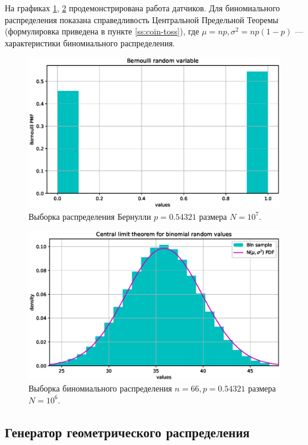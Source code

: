 \documentclass[11pt]{report}
\begin{document}
На графиках \ref{fig:bern}, \ref{fig:bin-clt} продемонстрирована работа датчиков. Для биномиального распределения показана справедливость Центральной Предельной Теоремы (формулировка приведена в пункте \ref{ss:coin-toss}), где $\mu = np, \sigma^2 = np(1-p)$ --- характеристики биномиального распределения.

\begin{figure}[H]
    \centering
    \includegraphics[width=0.9\linewidth]{bern.eps}
    \caption{Выборка распределения Бернулли $p=0.54321$ размера $N=10^7$.}
    \label{fig:bern}
\end{figure}

\begin{figure}[H]
    \centering
    \includegraphics[width=0.9\linewidth]{bin-clt.eps}
    \caption{Выборка биномиального распределения $n=66, p=0.54321$ размера $N=10^6$.}
    \label{fig:bin-clt}
\end{figure}

\subsection{Генератор геометрического распределения}\label{ss:geom}
\end{document}
